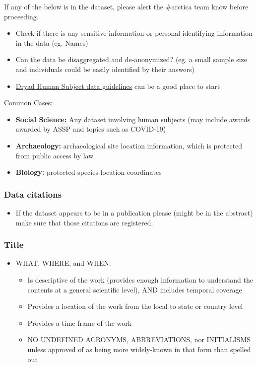 \documentclass[
  letterpaper,
  DIV=11,
  numbers=noendperiod]{scrreprt}
\providecommand{\tightlist}{%
  \setlength{\itemsep}{0pt}\setlength{\parskip}{0pt}}\usepackage{longtable,booktabs,array}
\begin{document}
If any of the below is in the dataset, please alert the \#arctica team
know before proceeding.

\begin{itemize}
\tightlist
\item
  Check if there is any sensitive information or personal identifying
  information in the data (eg. Names)
\item
  Can the data be disaggregated and de-anonymized? (eg. a small sample
  size and individuals could be easily identified by their answers)
\item
  \href{https://datadryad.org/docs/HumanSubjectsData.pdf}{Dryad Human
  Subject data guidelines} can be a good place to start
\end{itemize}

Common Cases:

\begin{itemize}
\tightlist
\item
  \textbf{Social Science:} Any dataset involving human subjects (may
  include awards awarded by ASSP and topics such as COVID-19)
\item
  \textbf{Archaeology:} archaeological site location information, which
  is protected from public access by law
\item
  \textbf{Biology:} protected species location coordinates
\end{itemize}

\hypertarget{data-citations}{%
\subsubsection{Data citations}\label{data-citations}}

\begin{itemize}
\tightlist
\item
  If the dataset appears to be in a publication please (might be in the
  abstract) make sure that those citations are registered.
\end{itemize}

\hypertarget{title}{%
\subsubsection{Title}\label{title}}

\begin{itemize}
\tightlist
\item
  WHAT, WHERE, and WHEN:

  \begin{itemize}
  \tightlist
  \item
    Is descriptive of the work (provides enough information to
    understand the contents at a general scientific level), AND includes
    temporal coverage
  \item
    Provides a location of the work from the local to state or country
    level
  \item
    Provides a time frame of the work
  \item
    NO UNDEFINED ACRONYMS, ABBREVIATIONS, nor INITIALISMS unless
    approved of as being more widely-known in that form than spelled out
  \end{itemize}
\end{itemize}
\end{document}
